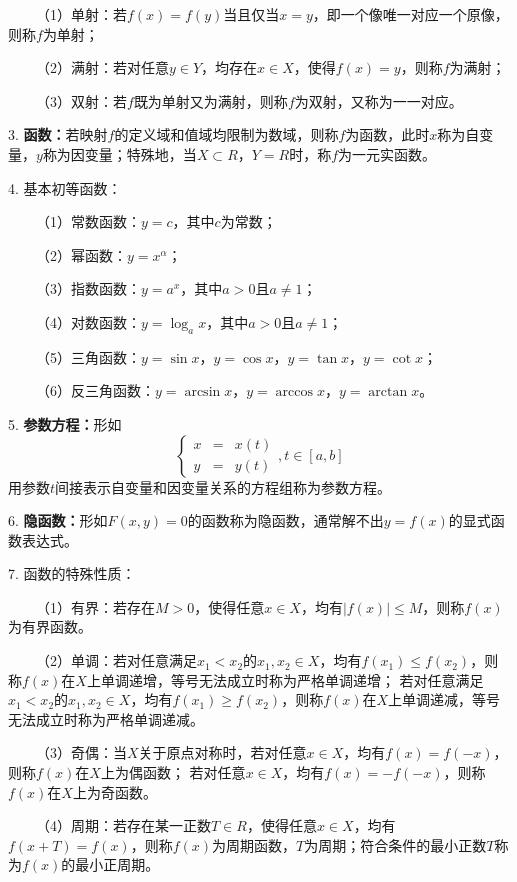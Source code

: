 ~~~~（1）单射：若$f(x)=f(y)$当且仅当$x=y$，即一个像唯一对应一个原像，则称$f$为单射；

~~~~（2）满射：若对任意$y\in Y$，均存在$x \in X$，使得$f(x)=y$，则称$f$为满射；

~~~~（3）双射：若$f$既为单射又为满射，则称$f$为双射，又称为一一对应。

3. \textbf{函数：}若映射$f$的定义域和值域均限制为数域，则称$f$为函数，此时$x$称为自变量，$y$称为因变量；特殊地，当$X \subset R$，$Y=R$时，称$f$为一元实函数。

4. 基本初等函数：

~~~~（1）常数函数：$y=c$，其中$c$为常数；

~~~~（2）幂函数：$y=x^\alpha$；

~~~~（3）指数函数：$y=a^x$，其中$a>0$且$a\neq 1$；

~~~~（4）对数函数：$y=\log_a x$，其中$a>0$且$a \neq 1$；

~~~~（5）三角函数：$y=\sin x$，$y=\cos x$，$y=\tan x$，$y=\cot x$；

~~~~（6）反三角函数：$y=\arcsin x$，$y=\arccos x$，$y=\arctan x$。

5. \textbf{参数方程：}形如
\begin{equation*}
    \left\{\begin{aligned}
        x&=&x(t)\\
        y&=&y(t)
    \end{aligned}\right. , t\in[a,b]
\end{equation*}用参数$t$间接表示自变量和因变量关系的方程组称为参数方程。

6. \textbf{隐函数：}形如$F(x,y)=0$的函数称为隐函数，通常解不出$y=f(x)$的显式函数表达式。

7. 函数的特殊性质：

~~~~（1）有界：若存在$ M>0$，使得任意$x \in X$，均有$|f(x)|\leqslant M$，则称$f(x)$为有界函数。

~~~~（2）单调：若对任意满足$x_1<x_2$的$x_1,x_2 \in X$，均有$f(x_1)\leqslant f(x_2)$，则称$f(x)$在$X$上单调递增，等号无法成立时称为严格单调递增；
若对任意满足$x_1<x_2$的$x_1,x_2 \in X$，均有$f(x_1)\geqslant f(x_2)$，则称$f(x)$在$X$上单调递减，等号无法成立时称为严格单调递减。

~~~~（3）奇偶：当$X$关于原点对称时，若对任意$x \in X$，均有$f(x)=f(-x)$，则称$f(x)$在$X$上为偶函数；
若对任意$x \in X$，均有$f(x)=-f(-x)$，则称$f(x)$在$X$上为奇函数。

~~~~（4）周期：若存在某一正数$T\in R$，使得任意$x \in X$，均有$f(x+T)=f(x)$，则称$f(x)$为周期函数，$T$为周期；符合条件的最小正数$T$称为$f(x)$的最小正周期。

